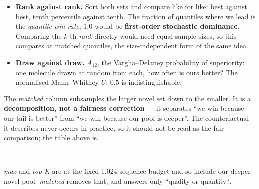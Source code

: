 \documentclass[11pt]{article}
\begin{document}
\begin{itemize}
  \item \textbf{Rank against rank.} Sort both sets and compare like for like:
        best against best, tenth percentile against tenth. The fraction of
        quantiles where we lead is the \emph{quantile win rate}; 1.0 would be
        \textbf{first-order stochastic dominance}. Comparing the $k$-th
        \emph{rank} directly would need equal sample sizes, so this compares at
        matched quantiles, the size-independent form of the same idea.
  \item \textbf{Draw against draw.} $A_{12}$, the Vargha--Delaney probability of
        superiority: one molecule drawn at random from each, how often is ours
        better? The normalised Mann--Whitney $U$; $0.5$ is indistinguishable.
\end{itemize}

The \emph{matched} column subsamples the larger novel set down to the smaller.
It is a \textbf{decomposition, not a fairness correction} --- it separates
``we win because our tail is better'' from ``we win because our pool is deeper''.
The counterfactual it describes never occurs in practice, so it should not be
read as the fair comparison; the table above is.

\begin{table}[htbp]
\centering
\small
{}
\\[0.4em] \begin{minipage}{0.92\textwidth}\footnotesize \emph{max} and \emph{top-K} are at the fixed 1,024-sequence budget and so include our deeper novel pool. \emph{matched} removes that, and answers only ``quality or quantity?.\end{minipage}
\caption{Each method at its own best setting by top-10. \emph{q-win} and $A_{12}$ sit on the ours row and describe ours against D-CBG.}
\label{tab:beyond-ring_count}
\end{table}
\end{document}
